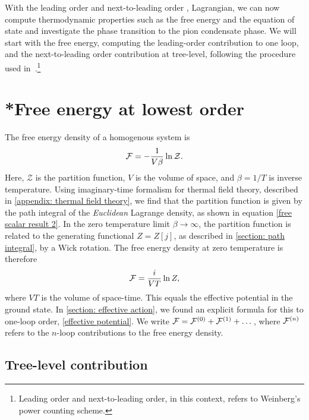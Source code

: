 With the leading order and next-to-leading order \chpt, Lagrangian, we can now compute thermodynamic properties such as the free energy and the equation of state and investigate the phase transition to the pion condensate phase.
We will start with the free energy, computing the leading-order contribution to one loop, and the next-to-leading order contribution at tree-level, following the procedure used in~\autocite{adhikariTwoflavorChiralPerturbation2019,martinariaTwoflavorChiralPerturbation2020}.\footnote{Leading order and next-to-leading order, in this context, refers to Weinberg's power counting scheme.}



\section{*Free energy at lowest order}
\label{section: free energy at lowest order}

The free energy density of a homogenous system is
%
\begin{equation}
    \mathcal{F} = - \frac{1}{V \beta} \ln \mathcal{Z}.
\end{equation}
%
Here, $\mathcal{Z}$ is the partition function, $V$ is the volume of space, and $\beta = 1/T$ is inverse temperature.
Using imaginary-time formalism for thermal field theory, described in \autoref{appendix: thermal field theory}, we find that the partition function is given by the path integral of the \emph{Euclidean} Lagrange density, as shown in equation \autoref{free scalar result 2}.
In the zero temperature limit  $\beta \rightarrow \infty$, the partition function is related to the generating functional $Z = Z[j]$, as described in \autoref{section: path integral}, by a Wick rotation.
The free energy density at zero temperature is therefore
%
\begin{equation}
    \mathcal{F} = \frac{i}{VT} \ln Z,
\end{equation}
%
where $VT$ is the volume of space-time.
This equals the effective potential in the ground state.
In \autoref{section: effective action}, we found an explicit formula for this to one-loop order, \autoref{effective potential}.
We write $\mathcal{F} = \mathcal{F}^{(0)} + \mathcal{F}^{(1)} + \dots$, where $\mathcal{F}^{(n)}$ refers to the $n$-loop contributions to the free energy density.


\subsection{Tree-level contribution}

